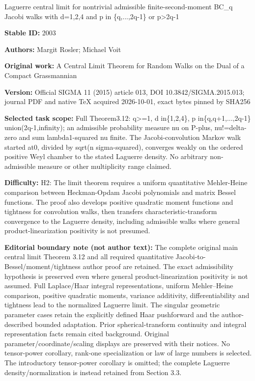 \documentclass[11pt]{article}
\numberwithin{equation}{section}
\begin{document}
\begin{center}\Large Laguerre central limit for nontrivial admissible finite-second-moment BC\_q Jacobi walks with d=\allowbreak{}1,2,4 and p in \{q,...,2q-1\} or p>2q-1\end{center}
\noindent\textbf{Stable ID:} 2003\par
\noindent\textbf{Authors:} Margit Rosler; Michael Voit\par
\noindent\textbf{Original work:} A Central Limit Theorem for Random Walks on the Dual of a Compact Grassmannian\par
\noindent\textbf{Version:} Official SIGMA 11 (2015) article 013, DOI 10.3842/SIGMA.2015.013; journal PDF and native TeX acquired 2026-10-01, exact bytes pinned by SHA256\par
\noindent\textbf{Selected task scope:} Full Theorem3.12: q>=\allowbreak{}1, d in\{1,2,4\}, p in\{q,q+\allowbreak{}1,...,2q-1\} union(2q-1,infinity); an admissible probability measure nu on P-plus, nu!=\allowbreak{}delta-zero and sum lambda1-squared nu finite. The Jacobi-convolution Markov walk started at0, divided by sqrt(n sigma-squared), converges weakly on the ordered positive Weyl chamber to the stated Laguerre density. No arbitrary non-admissible measure or other multiplicity range claimed.\par
\noindent\textbf{Difficulty:} H2: The limit theorem requires a uniform quantitative Mehler-Heine comparison between Heckman-Opdam Jacobi polynomials and matrix Bessel functions. The proof also develops positive quadratic moment functions and tightness for convolution walks, then transfers characteristic-transform convergence to the Laguerre density, including admissible walks where general product-linearization positivity is not presumed.\par
\noindent\textbf{Editorial boundary note (not author text):} The complete original main central limit Theorem 3.12 and all required quantitative Jacobi-to-Bessel/moment/tightness author proof are retained. The exact admissibility hypothesis is preserved even where general product-linearization positivity is not assumed. Full Laplace/Haar integral representations, uniform Mehler–Heine comparison, positive quadratic moments, variance additivity, differentiability and tightness lead to the normalized Laguerre limit. The singular geometric parameter cases retain the explicitly defined Haar pushforward and the author-described bounded adaptation. Prior spherical-transform continuity and integral representation facts remain cited background. Original parameter/coordinate/scaling displays are preserved with their notices. No tensor-power corollary, rank-one specialization or law of large numbers is selected. The introductory tensor-power corollary is omitted; the complete Laguerre density/normalization is instead retained from Section 3.3.\par
\end{document}
